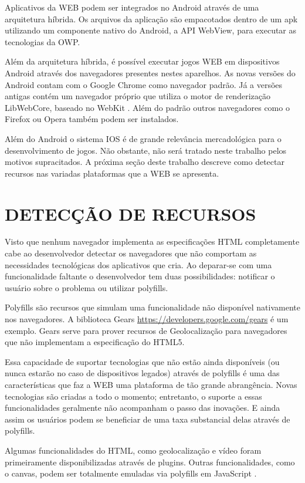 Aplicativos da WEB podem ser integrados no Android através de uma
arquitetura híbrida. Os arquivos da aplicação são empacotados dentro
de um apk utilizando um componente nativo do Android, a API WebView, para
executar as tecnologias da OWP.

Além da arquitetura híbrida, é possível executar jogos WEB em
dispositivos Android através dos navegadores presentes nestes
aparelhos. As novas versões do Android contam com o Google Chrome como navegador
padrão. Já a versões antigas contém um navegador próprio
que utiliza o motor de renderização LibWebCore, baseado no WebKit
\autocite{comparisonPlatforms}. Além do padrão outros navegadores como
o Firefox ou Opera também podem ser instalados.

Além do Android o sistema IOS é de grande relevância mercadológica
para o desenvolvimento de jogos. Não obstante, não será tratado neste
trabalho pelos motivos supracitados. A próxima seção deste trabalho
descreve como detectar recursos nas variadas plataformas que a WEB se
apresenta.

\section{DETECÇÃO DE RECURSOS}
Visto que nenhum navegador implementa as especificações HTML
completamente cabe ao desenvolvedor detectar os navegadores que não
comportam as necessidades tecnológicas dos aplicativos que cria. Ao
deparar-se com uma funcionalidade faltante o desenvolvedor tem duas
possibilidades: notificar o usuário sobre o problema ou utilizar
polyfills.

Polyfills são recursos que simulam uma funcionalidade não
disponível nativamente nos navegadores. A biblioteca Gears
\url{https://developers.google.com/gears} é um exemplo. Gears
serve para prover recursos de Geolocalização para navegadores que
não implementam a especificação do HTML5.

Essa capacidade de suportar tecnologias que não estão ainda
disponíveis (ou nunca estarão no caso de dispositivos legados)
através de polyfills é uma das características que faz a WEB uma
plataforma de tão grande abrangência. Novas tecnologias são criadas a
todo o momento; entretanto, o suporte a essas funcionalidades geralmente
não acompanham o passo das inovações. E ainda assim os usuários
podem se beneficiar de uma taxa substancial delas através de polyfills.

Algumas funcionalidades do HTML, como geolocalização e vídeo
foram primeiramente disponibilizadas através de plugins. Outras
funcionalidades, como o canvas, podem ser totalmente emuladas via
polyfills em JavaScript \autocite{diveIntohtml}.


